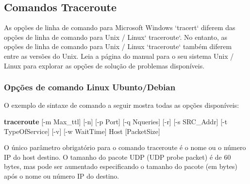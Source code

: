 \documentclass[
	article,			%
	11pt,				%
	oneside,			%
	a4paper,			%
	english,			%
	brazil,				%
	sumario=tradicional
	]{abntex2}
\begin{document}
\subsection{Comandos Traceroute} \label{sec:comandos}
As opções de linha de comando para Microsoft Windows `tracert` diferem das opções de linha de comando para Unix / Linux` traceroute`. No entanto, as opções de linha de comando para Unix / Linux `traceroute` também diferem entre as versões do Unix. Leia a página do manual para o seu sistema Unix / Linux para explorar as opções de solução de problemas disponíveis.

\subsubsection{Opções de comando Linux Ubunto/Debian}

O exemplo de sintaxe de comando a seguir mostra todas as opções disponíveis:

\textbf{traceroute }[-m Max\_ttl] [-n] [-p Port] [-q Nqueries] [-r] [-s SRC\_Addr] [-t TypeOfService] [-v] [-w WaitTime] Host [PacketSize]

O único parâmetro obrigatório para o comando traceroute é o nome ou o número IP do host destino. O tamanho do pacote UDP (UDP probe packet) é de 60 bytes, mas pode ser aumentado especificando o tamanho do pacote (em bytes) após o nome ou número IP do destino.
\end{document}

